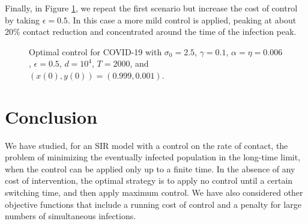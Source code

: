 \documentclass[english,12pt,letter]{article}
\newcommand{\Rnot}{\sigma_0}
\begin{document}
Finally, in Figure \ref{fig:real-world-3}, we repeat the first scenario
but increase the cost of control by taking $\epsilon=0.5$.
In this case a more mild control is applied, peaking at about
20\% contact reduction and concentrated around the time of the
infection peak.
\begin{figure}
    \centering
    \caption{Optimal control for COVID-19 with $\Rnot=2.5$, $\gamma=0.1$,
                $\alpha=\eta=0.006$, $\epsilon=0.5$, $d=10^4$, $T=2000$, and $(x(0),y(0)) =
                (0.999,0.001)$.\label{fig:real-world-3}}
\end{figure}


\section{Conclusion\label{sec:conclusion}}
We have studied, for an SIR model with a control on the rate of contact, the
problem of minimizing the eventually infected population in the long-time limit,
when the control can be applied only up to a finite time.  In the absence of any
cost of intervention, the optimal strategy is to apply no control until a
certain switching time, and then apply maximum control.  We have also considered
other objective functions that include a running cost of control and a penalty for
large numbers of simultaneous infections.
\end{document}
